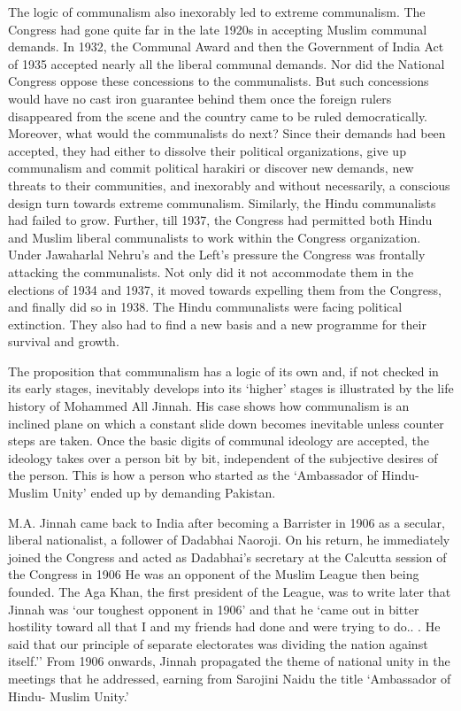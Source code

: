 The logic of communalism also inexorably led to extreme communalism. The Congress had gone quite far in the late 1920s in accepting Muslim communal demands. In 1932, the Communal Award and then the Government of India Act of 1935 accepted nearly all the liberal communal demands. Nor did the National Congress oppose these concessions to the communalists. But such concessions would have no cast iron guarantee behind them once the foreign rulers disappeared from the scene and the country came to be ruled democratically. Moreover, what would the communalists do next? Since their demands had been accepted, they had either to dissolve their political organizations, give up communalism and commit political harakiri or discover new demands, new threats to their communities, and inexorably and without necessarily, a conscious design turn towards extreme communalism. Similarly, the Hindu communalists had failed to grow. Further, till 1937, the Congress had permitted both Hindu and Muslim liberal communalists to work within the Congress organization. Under Jawaharlal Nehru's and the Left's pressure the Congress was frontally attacking the communalists. Not only did it not accommodate them in the elections of 1934 and 1937, it moved towards expelling them from the Congress, and finally did so in 1938. The Hindu communalists were facing political extinction. They also had to find a new basis and a new programme for their survival and growth. 

The proposition that communalism has a logic of its own and, if not checked in its early stages, inevitably develops into its `higher' stages is illustrated by the life history of Mohammed All Jinnah. His case shows how communalism is an inclined plane on which a constant slide down becomes inevitable unless counter steps are taken. Once the basic digits of communal ideology are accepted, the ideology takes over a person bit by bit, independent of the subjective desires of the person. This is how a person who started as the `Ambassador of Hindu-Muslim Unity' ended up by demanding Pakistan. 

M.A. Jinnah came back to India after becoming a Barrister in 1906 as a secular, liberal nationalist, a follower of Dadabhai Naoroji. On his return, he immediately joined the Congress and acted as Dadabhai's secretary at the Calcutta session of the Congress in 1906 He was an opponent of the Muslim League then being founded. The Aga Khan, the first president of the League, was to write later that Jinnah was `our toughest opponent in 1906' and that he `came out in bitter hostility toward all that I and my friends had done and were trying to do.. . He said that our principle of separate electorates was dividing the nation against itself.'' From 1906 onwards, Jinnah propagated the theme of national unity in the meetings that he addressed, earning from Sarojini Naidu the title `Ambassador of Hindu- Muslim Unity.' 

